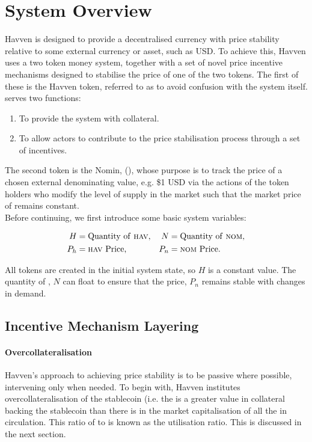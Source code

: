 
\section{System Overview} Havven is designed to provide a decentralised currency with price stability relative to some external currency or asset, such as USD. To achieve this, Havven uses a two token money system, together with a set of novel price incentive mechanisms designed to stabilise the price of one of the two tokens. The first of these is the Havven token, referred to as \HAV{} to avoid confusion with the system itself. \HAV{} serves two functions:

\begin{enumerate}
\item{To provide the system with collateral.}
\item{To allow actors to contribute to the price stabilisation process through a set of incentives.}
\end{enumerate}

\noindent The second token is the Nomin, (\NOM{}), whose purpose is to track the price of a chosen external denominating value, e.g. \$1 USD via the actions of the \HAV{} token holders who modify the level of supply in the \NOM{} market such that the market price of \NOM{} remains constant. \\

\noindent Before continuing, we first introduce some basic system variables:

\begin{align*}
H &= \text{Quantity of \textsc{hav}{},} & N &= \text{Quantity of \textsc{nom}{},} \\
P_h &= \text{\textsc{hav}{} Price,}  & P_n &= \text{\textsc{nom}{} Price.}
\end{align*}

\noindent All \HAV{} tokens are created in the initial system state, so $H$ is a constant value. The quantity of \NOM{}, $N$ can float to ensure that the \NOM{} price, $P_n$ remains stable with changes in demand.

\subsection{Incentive Mechanism Layering}

\paragraph{Overcollateralisation}

Havven's approach to achieving price stability is to be passive where possible, intervening only when needed. To begin with, Havven institutes overcollateralisation of the stablecoin (i.e. the is a greater value in collateral backing the stablecoin than there is in the market capitalisation of all the \NOM{} in circulation. This ratio of \NOM{} to \HAV{} is known as the utilisation ratio. This is discussed in the next section.

